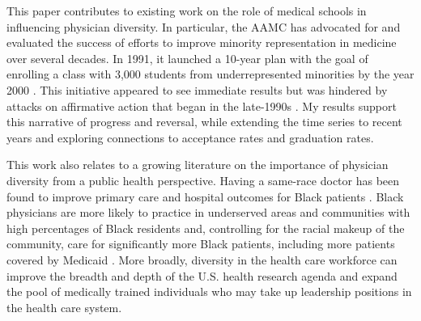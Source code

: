 \documentclass[12pt]{article}
\begin{document}
This paper contributes to existing work on the role of medical schools in influencing physician diversity. In particular, the AAMC has advocated for and evaluated the success of efforts to improve minority representation in medicine over several decades. In 1991, it launched a 10-year plan with the goal of enrolling a class with 3,000 students from underrepresented minorities by the year 2000 \citep{cohen_case_2002}. This initiative appeared to see immediate results but was hindered by attacks on affirmative action that began in the late-1990s \citep{garces_racial_2015,mickey-pabello_addressing_2018}. My results support this narrative of progress and reversal, while extending the time series to recent years and exploring connections to acceptance rates and graduation rates.  

This work also relates to a growing literature on the importance of physician diversity from a public health perspective. Having a same-race doctor has been found to improve primary care and hospital outcomes for Black patients \citep{alsan_does_2019,hill_physician-patient_2020}. Black physicians are more likely to practice in underserved areas and communities with high percentages of Black residents and, controlling for the racial makeup of the community, care for significantly more Black patients, including more patients covered by Medicaid \citep{komaromy_role_1996, laditka_physician_2004,xierali_racial_2018}. More broadly, diversity in the health care workforce can improve the breadth and depth of the U.S. health research agenda and expand the pool of medically trained individuals who may take up leadership positions in the health care system.








\end{document}
